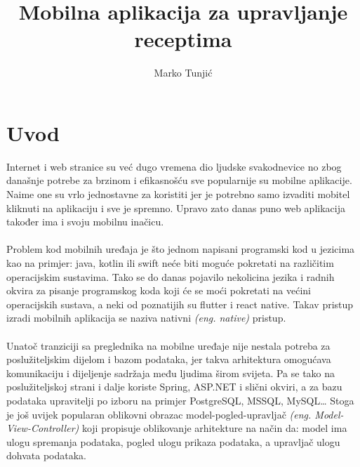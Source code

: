 \documentclass[times, utf8, zavrsni]{fer}
\begin{document}

\title{Mobilna aplikacija za upravljanje receptima}

\author{Marko Tunjić}

\maketitle

\zahvala{}

\tableofcontents

\chapter{Uvod}
Internet i web stranice su već dugo vremena dio ljudske svakodnevice no zbog
današnje potrebe za brzinom i efikasnošću sve popularnije su mobilne aplikacije. Naime one
su vrlo jednostavne za koristiti jer je potrebno samo izvaditi mobitel
kliknuti na aplikaciju i sve je spremno. Upravo zato danas puno web aplikacija
također ima i svoju mobilnu inačicu.
\\\\
Problem kod mobilnih uređaja je što jednom napisani programski kod u jezicima kao na primjer:
java, kotlin ili swift neće biti moguće pokretati na različitim operacijskim sustavima.
Tako se do danas pojavilo nekolicina jezika
i radnih okvira za pisanje programskog koda koji će se moći pokretati
na većini operacijskih sustava, a neki od poznatijih su flutter i react native.
Takav pristup izradi mobilnih aplikacija se naziva nativni \textit{(eng. native)} pristup.
\\\\
Unatoč tranziciji sa preglednika na mobilne uređaje nije nestala potreba
za poslužiteljskim dijelom i bazom podataka, jer takva arhitektura omogućava
komunikaciju i dijeljenje sadržaja među ljudima širom svijeta. Pa se tako na
poslužiteljskoj strani i dalje koriste Spring, ASP.NET i slični okviri,
a za bazu podataka upravitelji po izboru na primjer PostgreSQL, MSSQL, MySQL\dots
Stoga je još uvijek popularan oblikovni obrazac model-pogled-upravljač \textit{(eng. Model-View-Controller)}
koji propisuje oblikovanje arhitekture na način da: model ima ulogu
spremanja podataka, pogled ulogu prikaza podataka, a upravljač ulogu dohvata podataka.
\\\\
\end{document}
